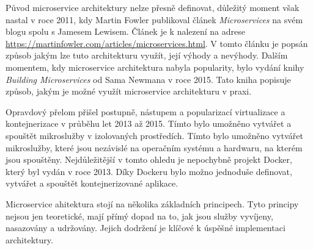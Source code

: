 
Původ microservice architektury nelze přesně definovat, důležitý moment však nastal v roce 2011, kdy Martin Fowler publikoval článek \textit{Microservices} na svém blogu spolu s Jamesem Lewisem. Článek je k nalezení na adrese \url{https://martinfowler.com/articles/microservices.html}. V tomto článku je popsán způsob jakým lze tuto architekturu využít, její výhody a nevýhody. Dalším momentem, kdy microservice architektura nabyla popularity, bylo vydání knihy \textit{Building Microservices} od Sama Newmana v roce 2015. Tato kniha popisuje způsob, jakým je možné využít microservice architekturu v praxi.

Opravdový přelom přišel postupně, nástupem a popularizací virtualizace a kontejnerizace v průběhu let 2013 až 2015. Tímto bylo umožněno vytvářet a spouštět mikroslužby v izolovaných prostředích. Tímto bylo umožněno vytvářet mikroslužby, které jsou nezávislé na operačním systému a hardwaru, na kterém jsou spouštěny. Nejdůležitější v tomto ohledu je nepochybně projekt Docker, který byl vydán v roce 2013. Díky Dockeru bylo možno jednoduše definovat, vytvářet a spouštět kontejnerizované aplikace. 


Microservice ahitektura stojí na několika základních principech. Tyto principy nejsou jen teoretické, mají přímý dopad na to, jak jsou služby vyvíjeny, nasazovány a udržovány. Jejich dodržení je klíčové k úspěšné implementaci architektury. \cite{Richardson2018}

